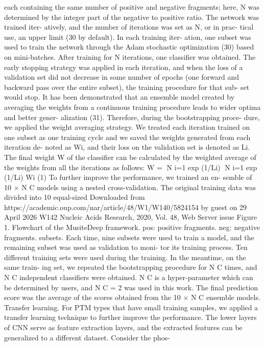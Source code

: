 each containing the same number of positive and negative
fragments; here, N was determined by the integer part of
the negative to positive ratio. The network was trained iter-
atively, and the number of iterations was set as N, or in prac-
tical use, an upper limit (30 by default). In each training iter-
ation, one subset was used to train the network through the
Adam stochastic optimization (30) based on mini-batches.
After training for N iterations, one classifier was obtained.
The early stopping strategy was applied in each iteration,
and when the loss of a validation set did not decrease in
some number of epochs (one forward and backward pass
over the entire subset), the training procedure for that sub-
set would stop. It has been demonstrated that an ensemble
model created by averaging the weights from a continuous
training procedure leads to wider optima and better gener-
alization (31). Therefore, during the bootstrapping proce-
dure, we applied the weight averaging strategy. We treated
each iteration trained on one subset as one training cycle
and we saved the weights generated from each iteration de-
noted as Wi, and their loss on the validation set is denoted
as Li. The final weight W of the classifier can be calculated
by the weighted average of the weights from all the iterations
as follows:
W =
N
i=1
exp (1/Li)
N
i=1 exp (1/Li)
Wi
(1)
To further improve the performance, we trained an en-
semble of 10 × N C models using a nested cross-validation.
The original training data was divided into 10 equal-sized
Downloaded from https://academic.oup.com/nar/article/48/W1/W140/5824154 by guest on 29 April 2026
W142 Nucleic Acids Research, 2020, Vol. 48, Web Server issue
Figure 1. Flowchart of the MusiteDeep framework. pos: positive fragments. neg: negative fragments.
subsets. Each time, nine subsets were used to train a model,
and the remaining subset was used as validation to moni-
tor its training process. Ten different training sets were used
during the training. In the meantime, on the same train-
ing set, we repeated the bootstrapping procedure for N C
times, and N C independent classifiers were obtained. N C
is a hyper-parameter which can be determined by users, and
N C = 2 was used in this work. The final prediction score
was the average of the scores obtained from the 10 × N C
ensemble models.
Transfer learning.
For PTM types that have small training
samples, we applied a transfer learning technique to further
improve the performance. The lower layers of CNN serve
as feature extraction layers, and the extracted features can
be generalized to a different dataset. Consider the phos-
